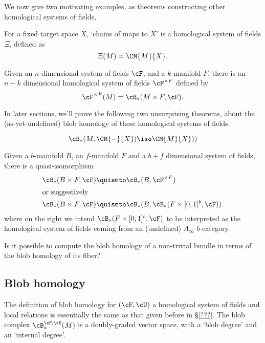 
We now give two motivating examples, as theorems constructing other homological systems of fields,


\begin{thm}
For a fixed target space $X$, `chains of maps to $X$' is a homological system of fields $\Xi$, defined as
\begin{equation*}
\Xi(M) = \CM{M}{X}.
\end{equation*}
\end{thm}

\begin{thm}
Given an $n$-dimensional system of fields $\cF$, and a $k$-manifold $F$, there is an $n-k$ dimensional homological system of fields $\cF^{\times F}$ defined by
\begin{equation*}
\cF^{\times F}(M) = \cB_*(M \times F, \cF).
\end{equation*}
\end{thm}

In later sections, we'll prove the following two unsurprising theorems, about the (as-yet-undefined) blob homology of these homological systems of fields.


\begin{thm}
\begin{equation*}
\cB_*(M, \CM{-}{X}) \iso \CM{M}{X}))
\end{equation*}
\end{thm}

\begin{thm}
Given a $b$-manifold $B$, an $f$-manifold $F$ and a $b+f$ dimensional system of fields,
there is a quasi-isomorphism
\begin{align*}
\cB_*(B \times F, \cF) & \quismto \cB_*(B, \cF^{\times F}) \\
\intertext{or suggestively}
\cB_*(B \times F, \cF) & \quismto  \cB_*(B, \cB_*(F \times [0,1]^b, \cF)).
\end{align*}
where on the right we intend $\cB_*(F \times [0,1]^b, \cF)$ to be interpreted as the homological system of fields coming from an (undefined) $A_\infty$ $b$-category.
\end{thm}

\begin{question}
Is it possible to compute the blob homology of a non-trivial bundle in terms of the blob homology of its fiber?
\end{question}


\subsection{Blob homology}
The definition of blob homology for $(\cF, \cU)$ a homological system of fields and local relations is essentially the same as that given before in \S \ref{???}.
The blob complex $\cB_*^{\cF,\cU}(M)$ is a doubly-graded vector space, with a `blob degree' and an `internal degree'. 

